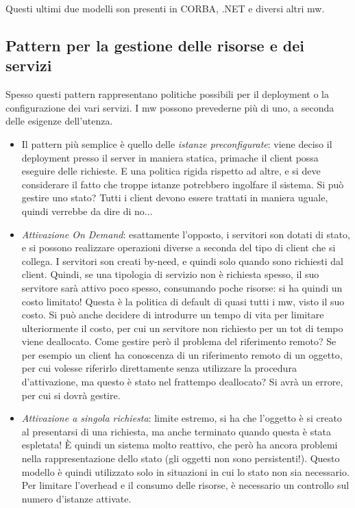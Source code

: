 Questi ultimi due modelli son presenti in CORBA, .NET e diversi altri mw.

\subsection{Pattern per la gestione delle risorse e dei servizi}
Spesso questi pattern rappresentano politiche possibili per il deployment o la configurazione dei vari servizi. I mw
possono prevederne più di uno, a seconda delle esigenze dell'utenza.
\begin{itemize}
 \item Il pattern più semplice è quello delle \textit{istanze preconfigurate}: viene deciso il deployment presso il
 server in maniera statica, primache il client possa eseguire delle richieste. E una politica rigida rispetto ad altre,
 e si deve considerare il fatto che troppe istanze potrebbero ingolfare il sistema. Si può gestire uno stato? Tutti i
 client devono essere trattati in maniera uguale, quindi verrebbe da dire di no...
 \item \textit{Attivazione On Demand}: esattamente l'opposto, i servitori son dotati di stato, e si possono realizzare
 operazioni diverse a seconda del tipo di client che si collega. I servitori son creati by-need, e quindi solo quando
 sono richiesti dal client. Quindi, se una tipologia di servizio non è richiesta spesso, il suo servitore sarà attivo
 poco spesso, consumando poche risorse: si ha quindi un costo limitato! Questa è la politica di default di quasi tutti
 i mw, visto il suo costo.
 Si può anche decidere di introdurre un tempo di vita per limitare ulteriormente il costo, per cui un servitore non
 richiesto per un tot di tempo viene deallocato.
 Come gestire però il problema del riferimento remoto? Se per esempio un client ha conoscenza di un riferimento remoto
 di un oggetto, per cui volesse riferirlo direttamente senza utilizzare la procedura d'attivazione, ma questo è stato
 nel frattempo deallocato? Si avrà un errore, per cui si dovrà gestire.
 \item \textit{Attivazione a singola richiesta}: limite estremo, si ha che l'oggetto è si creato al presentarsi di una
 richiesta, ma anche terminato quando questa è stata espletata! È quindi un sistema molto reattivo, che però ha ancora
 problemi nella rappresentazione dello stato (gli oggetti non sono persistenti!). Questo modello è quindi utilizzato
 solo in situazioni in cui lo stato non sia necessario. Per limitare l'overhead e il consumo delle risorse, è
 necessario un controllo sul numero d'istanze attivate.

\end{itemize}
